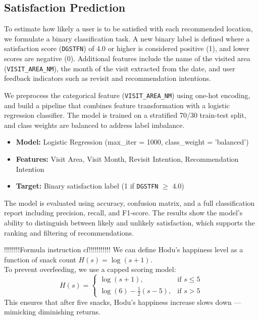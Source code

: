 \documentclass[sigconf]{acmart}
\begin{document}
\subsection{Satisfaction Prediction}

To estimate how likely a user is to be satisfied with each recommended location, we formulate a binary classification task. A new binary label is defined where a satisfaction score (\texttt{DGSTFN}) of 4.0 or higher is considered positive (1), and lower scores are negative (0). Additional features include the name of the visited area (\texttt{VISIT\_AREA\_NM}), the month of the visit extracted from the date, and user feedback indicators such as revisit and recommendation intentions.

We preprocess the categorical feature (\texttt{VISIT\_AREA\_NM}) using one-hot encoding, and build a pipeline that combines feature transformation with a logistic regression classifier. The model is trained on a stratified 70/30 train-test split, and class weights are balanced to address label imbalance.

\begin{itemize}
  \item \textbf{Model:} Logistic Regression (max\_iter = 1000, class\_weight = 'balanced')
  \item \textbf{Features:} Visit Area, Visit Month, Revisit Intention, Recommendation Intention
  \item \textbf{Target:} Binary satisfaction label (1 if \texttt{DGSTFN} $\geq$ 4.0)
\end{itemize}

The model is evaluated using accuracy, confusion matrix, and a full classification report including precision, recall, and F1-score. The results show the model’s ability to distinguish between likely and unlikely satisfaction, which supports the ranking and filtering of recommendations.


!!!!!!!!Formula instruction cf!!!!!!!!!!!
We can define Hodu’s happiness level as a function of 
snack count $H(s) = \log(s + 1)$. \\
To prevent overfeeding, we use a capped scoring model:
 \begin{equation}
  H(s) = 
  \begin{cases}
    \log(s + 1), & \text{if } s \leq 5 \\
    \log(6) - \frac{1}{2}(s - 5), & \text{if } s > 5
  \end{cases}
 \end{equation}
This ensures that after five snacks, Hodu’s happiness 
increase slows down — mimicking diminishing returns.
\end{document}
